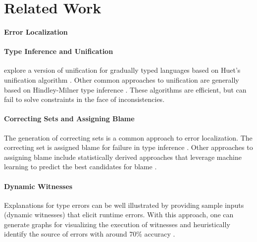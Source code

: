 \section{Related Work}
\label{sec:related}

\paragraph{Error Localization}

\paragraph{Type Inference and Unification}
\citet{GradualInfer} explore a version of unification for gradually typed languages based on Huet's unification algorithm \cite{Huet}. Other common approaches to unification are generally based on Hindley-Milner type inference \cite{MilnerInfer}. These algorithms are efficient, but can fail to solve constraints in the face of inconsistencies.


\paragraph{Correcting Sets and Assigning Blame}
The generation of correcting sets is a common approach to error localization. The correcting set is assigned blame for failure in type inference \cite{sherrloc, typeinferDif, Pavlinovic2015}. Other approaches to assigning blame include statistically derived approaches that leverage machine learning to predict the best candidates for blame \cite{SeidelBlame}.

\paragraph{Dynamic Witnesses}
Explanations for type errors can be well illustrated by providing sample inputs (dynamic witnesses) that elicit runtime errors. With this approach, one can generate graphs for visualizing the execution of witnesses and heuristically identify the source of errors with around 70\% accuracy \cite{Seidel2016}.